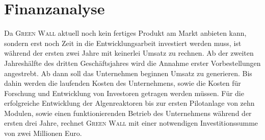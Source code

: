 \chapter{Finanzanalyse}

    Da \textsc{Green Wall} aktuell noch kein fertiges Produkt am Markt anbieten kann, sondern erst noch Zeit in die Entwicklungsarbeit investiert werden muss, ist während der ersten zwei Jahre mit keinerlei Umsatz zu rechnen. 
    Ab der zweiten Jahreshälfte des dritten Geschäftsjahres wird die Annahme erster Vorbestellungen angestrebt.
    Ab dann soll das Unternehmen beginnen Umsatz zu generieren.
    Bis dahin werden die laufenden Kosten des Unternehmens, sowie die Kosten für Forschung und Entwicklung von Investoren getragen werden müssen. 
    Für die erfolgreiche Entwicklung der Algenreaktoren bis zur ersten Pilotanlage von zehn Modulen, sowie einen funktionierenden Betrieb des Unternehmens während der ersten drei Jahre, rechnet \textsc{Green Wall} mit einer notwendigen Investitionssumme von zwei Millionen Euro.